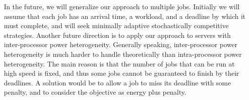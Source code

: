 In the future, we will generalize our approach to multiple jobs. Initially we will assume that each job has an arrival time, a workload, and a deadline by which it must complete, and will seek minimally adaptive stochastically competitive strategies. %
Another future direction is to apply our approach to servers with inter-processor power heterogeneity. %
Generally speaking, inter-processor power heterogeneity is much harder to handle theoretically than intra-processor power heterogeneity. The main reason is that the number of jobs that can be run at high speed is fixed, and thus some jobs cannot be guaranteed to finish by their deadlines. A solution would be to allow a job to miss its deadline with some penalty, and to consider the objective as energy plus penalty. %

